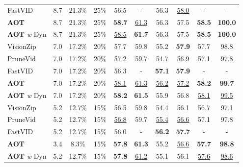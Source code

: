 \begin{table}[t]
{\begin{tabular}{l|ccc|cccc|cc}
FastVID~\cite{shen2025fastvid} & 8.7 & 21.3\% & 25\%
& 56.5 & - & 56.3 & \underline{58.0} & - & - \\

\textbf{AOT} & 8.7 & 21.3\% & 25\%
& \textbf{58.7} & \underline{61.3} & 56.3 & 57.5 & \textbf{58.5} &  \textbf{100.0} \\ %

\textbf{AOT} \textit{w} Dyn & 8.7 & 21.3\% & 25\%
& \underline{58.5} & \textbf{61.7} & 56.3 & 57.5 & \textbf{58.5} &  \textbf{100.0} \\ %

\midrule
VisionZip~\cite{yang2025visionzip} & 7.0 & 17.2\% & 20\%
& 57.7 & 59.8 & 55.2 & \textbf{57.9} & 57.7 & 98.8 \\ %

PruneVid~\cite{huang2024prunevid} & 7.0 & 17.2\% & 20\%
& 57.2 & 59.7 & 54.7 & 56.9 & 57.1 & 97.8 \\ %

FastVID~\cite{shen2025fastvid} & 7.0 & 17.2\% & 20\%
& 56.3 & - & \textbf{57.1} & \textbf{57.9} & - & - \\

\textbf{AOT} & 7.0 & 17.2\% & 20\%
& \underline{58.1}  & \underline{61.3} & \underline{56.2} & \underline{57.2} & \textbf{58.2} & \textbf{99.7} \\ %

\textbf{AOT} \textit{w} Dyn & 7.0 & 17.2\% & 20\%
& \textbf{58.2}  & \textbf{61.5} & 55.9 & 56.8 & \underline{58.1} & \underline{99.5}\\ %

\midrule
VisionZip~\cite{yang2025visionzip} & 5.2 & 12.7\% & 15\%
& 56.5 & 59.8 & 54.4 & 56.1 & 56.7 & 97.1 \\ %

PruneVid~\cite{huang2024prunevid} & 5.2 & 12.7\% & 15\%
& \underline{56.8} & 59.7 & \underline{55.4} & \underline{56.6} & 57.1 & 97.8 \\ %

FastVID~\cite{shen2025fastvid} & 5.2 & 12.7\% & 15\% & 56.0 & - & \textbf{56.2} & \textbf{57.7} & - & - \\

\textbf{AOT} & 3.4 & 8.3\% & 15\%
& \textbf{57.8}  & \textbf{61.3} & 55.2 & \underline{56.6} & \textbf{57.7} & \textbf{98.8} \\ %

\textbf{AOT} \textit{w} Dyn & 5.2 & 12.7\% & 15\%
& \textbf{57.8}  & \underline{61.2} & 55.1 & 56.1 & \underline{57.6} & \underline{98.6} \\ %


\end{tabular}}
\end{table}
